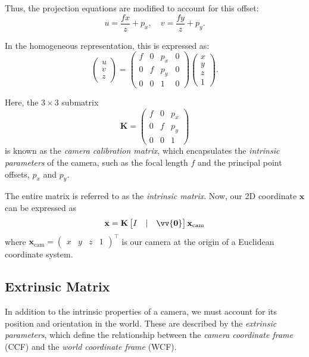 \documentclass[12pt]{article}
\newcommand{\vect}[1]{\vv{\mathbf{#1}}}
\begin{document}
Thus, the projection equations are modified to account for this offset:
$$
u = \frac{f x}{z} + p_x, \quad v = \frac{f y}{z} + p_y.
$$

In the homogeneous representation, this is expressed as:
$$
\begin{pmatrix} u \\ v \\ z \end{pmatrix} = 
\begin{pmatrix}
f & 0 & p_x & 0 \\
0 & f & p_y & 0 \\
0 & 0 & 1 & 0
\end{pmatrix}
\begin{pmatrix} x \\ y \\ z \\ 1 \end{pmatrix}.
$$

Here, the $3 \times 3$ submatrix
$$
\mathbf{K} = \begin{pmatrix}
f & 0 & p_x \\
0 & f & p_y \\
0 & 0 & 1
\end{pmatrix}
$$
is known as the \textit{camera calibration matrix}, which encapsulates the \textit{intrinsic parameters} of the camera, such as the focal length $f$ and the principal point offsets, $p_x$ and $p_y$.

The entire matrix is referred to as the \textit{intrinsic matrix}. Now, our 2D coordinate  $\mathbf{x}$ can be expressed as
$$
\mathbf{x} = \mathbf{K}\begin{bmatrix}
    I & | & \vect{0}
\end{bmatrix}\mathbf{x}_\text{cam}
$$
where $\mathbf{x}_\text{cam}=\begin{pmatrix}
    x & y & z & 1
\end{pmatrix}^\top$ is our camera at the origin of a Euclidean coordinate system.

\subsection{Extrinsic Matrix}

In addition to the intrinsic properties of a camera, we must account for its position and orientation in the world. These are described by the \textit{extrinsic parameters}, which define the relationship between the \textit{camera coordinate frame} (CCF) and the \textit{world coordinate frame} (WCF). 
\end{document}
